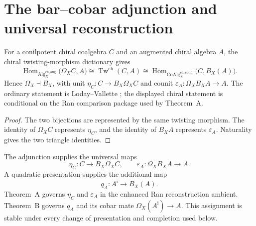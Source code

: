 \section{The bar--cobar adjunction and universal reconstruction}
\label{sec:thm-B-coalgebra-side-unit-qi}

\begin{lemma}
\label{lem:bar-cobar-adjunction-direction-canonical}
For a conilpotent chiral coalgebra \(C\) and an augmented chiral
algebra \(A\), the chiral twisting-morphism dictionary gives
\begin{equation}\label{eq:bar-cobar-hom-bijection-canonical}
\operatorname{Hom}_{\mathrm{Alg}^{\mathrm{ch,aug}}_X}
 \bigl(\Omega_XC,A\bigr)
\cong
\operatorname{Tw}^{\mathrm{ch}}(C,A)
\cong
\operatorname{Hom}_{\mathrm{CoAlg}^{\mathrm{ch,conil}}_X}
 \bigl(C,B_X(A)\bigr).
\end{equation}
Hence \(\Omega_X\dashv B_X\), with unit
\(\eta_C\colon C\to B_X\Omega_XC\) and counit
\(\varepsilon_A\colon\Omega_XB_XA\to A\).
The ordinary statement is Loday--Vallette
\cite[Theorem~2.2.9]{LV12}; the displayed chiral statement is
conditional on the Ran comparison package used by Theorem~A.
\end{lemma}

\begin{proof}
The two bijections are represented by the same twisting morphism.
The identity of \(\Omega_XC\) represents \(\eta_C\), and the identity
of \(B_XA\) represents \(\varepsilon_A\).  Naturality gives the two
triangle identities.
\end{proof}

\begin{remark}
\label{rem:two-theorem-B-statements}
The adjunction supplies the universal maps
\[
 \eta_C\colon C\longrightarrow B_X\Omega_XC,
 \qquad
 \varepsilon_A\colon\Omega_XB_XA\longrightarrow A.
\]
A quadratic presentation supplies the additional map
\[
 q_A\colon A^{\mathrm i}\longrightarrow B_X(A).
\]
Theorem~A governs \(\eta_C\) and \(\varepsilon_A\) in the enhanced
Ran reconstruction ambient.  Theorem~B governs \(q_A\) and its cobar
mate \(\Omega_X(A^{\mathrm i})\to A\).  This assignment is stable
under every change of presentation and completion used below.
\end{remark}

